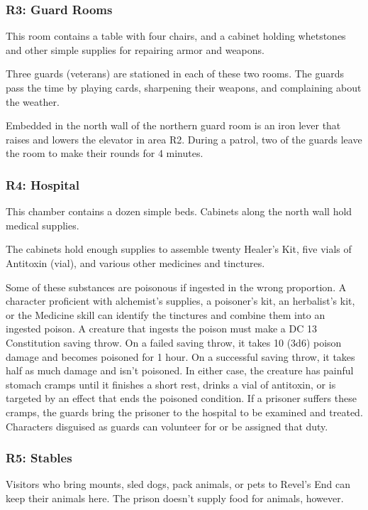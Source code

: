 \documentclass[10pt,a4paper,twoside,bg=print,twocolumn,openany,nodeprecatedcode]{dndbook}
\begin{document}
\subsubsection{R3: Guard Rooms}
\begin{DndReadAloud}{}
This room contains a table with four chairs, and a cabinet holding whetstones and other simple supplies for repairing armor and weapons.

\end{DndReadAloud}

Three guards (veterans) are stationed in each of these two rooms. The guards pass the time by playing cards, sharpening their weapons, and complaining about the weather.

Embedded in the north wall of the northern guard room is an iron lever that raises and lowers the elevator in area R2. During a patrol, two of the guards leave the room to make their rounds for 4 minutes.

\subsubsection{R4: Hospital}
\begin{DndReadAloud}{}
This chamber contains a dozen simple beds. Cabinets along the north wall hold medical supplies.

\end{DndReadAloud}

The cabinets hold enough supplies to assemble twenty Healer's Kit, five vials of Antitoxin (vial), and various other medicines and tinctures.

Some of these substances are poisonous if ingested in the wrong proportion. A character proficient with alchemist's supplies, a poisoner's kit, an herbalist's kit, or the Medicine skill can identify the tinctures and combine them into an ingested poison. A creature that ingests the poison must make a DC 13 Constitution saving throw. On a failed saving throw, it takes 10 (3d6) poison damage and becomes poisoned for 1 hour. On a successful saving throw, it takes half as much damage and isn't poisoned. In either case, the creature has painful stomach cramps until it finishes a short rest, drinks a vial of antitoxin, or is targeted by an effect that ends the poisoned condition. If a prisoner suffers these cramps, the guards bring the prisoner to the hospital to be examined and treated. Characters disguised as guards can volunteer for or be assigned that duty.

\subsubsection{R5: Stables}
Visitors who bring mounts, sled dogs, pack animals, or pets to Revel's End can keep their animals here. The prison doesn't supply food for animals, however.
\end{document}
